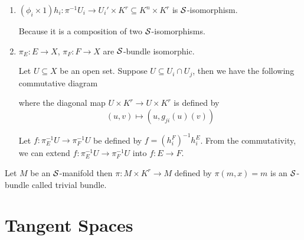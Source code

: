 \begin{remark}
\begin{longproof}
\begin{enumerate}
			\item $(\phi_i \times 1) h_i: \pi^{-1} U_i \to U_i' \times K^r \subseteq K^n \times K^r$ is $\mathcal{S}$-isomorphism.
			
			Because it is a composition of two $\mathcal{S}$-isomorphisms.
			
			\item $\pi_E: E \to X$, $\pi_F: F \to X$ are $\mathcal{S}$-bundle isomorphic.
			
			Let $U \subseteq X$ be an open set. Suppose $U \subseteq U_i \cap U_j$, then we have the following commutative diagram
			\begin{center}
			\end{center}
			
			where the diagonal map $U \times K^r \to U \times K^r$ is defined by
			$$
			(u, v) \mapsto (u, g_{ji}(u)(v))
			$$
			
			Let $f: \pi_E^{-1} U \to \pi_F^{-1} U$ be defined by $f = (h_i^F)^{-1} h_i^E$. From the commutativity, we can extend $f: \pi_E^{-1} U \to \pi_F^{-1} U$ into $f: E \to F$. 
			
		\end{enumerate}
	\end{longproof}
\end{remark}

\begin{definition}
	Let $M$ be an $\mathcal{S}$-manifold then $\pi: M \times K^r \to M$ defined by $\pi(m, x) = m$ is an $\mathcal{S}$-bundle called trivial bundle.
\end{definition}

\section{Tangent Spaces}

